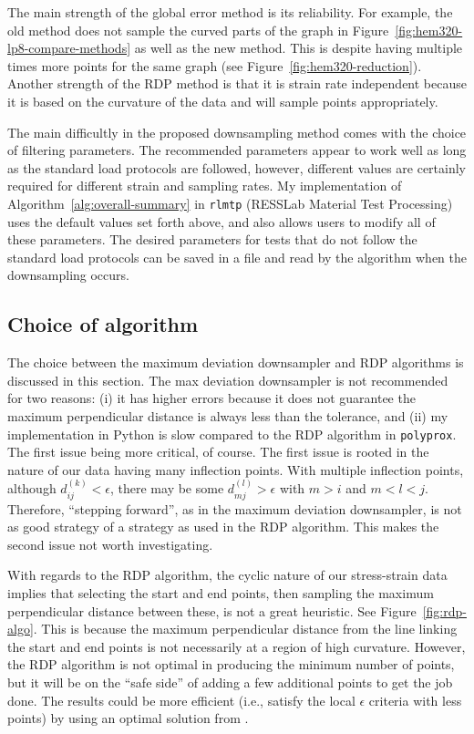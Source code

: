 \documentclass[a4paper,11pt]{article}
\begin{document}
The main strength of the global error method is its reliability.
For example, the old method does not sample the curved parts of the graph in Figure~\ref{fig:hem320-lp8-compare-methods} as well as the new method.
This is despite having multiple times more points for the same graph (see Figure~\ref{fig:hem320-reduction}).
Another strength of the RDP method is that it is strain rate independent because it is based on the curvature of the data and will sample points appropriately.

The main difficultly in the proposed downsampling method comes with the choice of filtering parameters.
The recommended parameters appear to work well as long as the standard load protocols are followed, however, different values are certainly required for different strain and sampling rates.
My implementation of Algorithm~\ref{alg:overall-summary} in \texttt{rlmtp} (RESSLab Material Test Processing) uses the default values set forth above, and also allows users to modify all of these parameters.
The desired parameters for tests that do not follow the standard load protocols can be saved in a file and read by the algorithm when the downsampling occurs.

\subsection{Choice of algorithm}

The choice between the maximum deviation downsampler and RDP algorithms is discussed in this section.
The max deviation downsampler is not recommended for two reasons:
(i) it has higher errors because it does not guarantee the maximum perpendicular distance is always less than the tolerance, and (ii) my implementation in Python is slow compared to the RDP algorithm in \texttt{polyprox}.
The first issue being more critical, of course.
The first issue is rooted in the nature of our data having many inflection points.
With multiple inflection points, although $d^{(k)}_{ij} < \epsilon$, there may be some $d^{(l)}_{mj} > \epsilon$ with $m > i$ and $m < l < j$.
Therefore, ``stepping forward'', as in the maximum deviation downsampler, is not as good strategy of a strategy as used in the RDP algorithm.
This makes the second issue not worth investigating.

With regards to the RDP algorithm, the cyclic nature of our stress-strain data implies that selecting the start and end points, then sampling the maximum perpendicular distance between these, is not a great heuristic.
See Figure~\ref{fig:rdp-algo}.
This is because the maximum perpendicular distance from the line linking the start and end points is not necessarily at a region of high curvature.
However, the RDP algorithm is not optimal in producing the minimum number of points, but it will be on the ``safe side'' of adding a few additional points to get the job done.
The results could be more efficient (i.e., satisfy the local $\epsilon$ criteria with less points) by using an optimal solution from \citet{ChanApproximationPolygonalCurves1996}.
\end{document}

